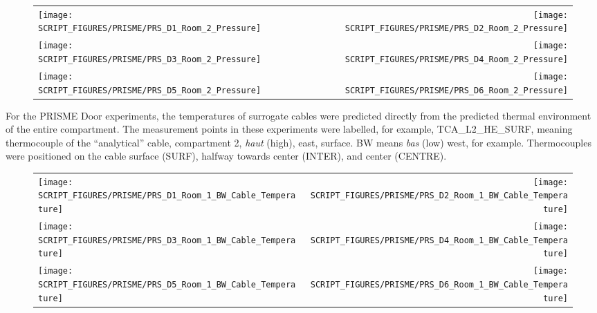 \begin{figure}[p]
\begin{tabular*}{\textwidth}{l@{\extracolsep{\fill}}r}
\texttt{[image: SCRIPT\_FIGURES/PRISME/PRS\_D1\_Room\_2\_Pressure]} &
\texttt{[image: SCRIPT\_FIGURES/PRISME/PRS\_D2\_Room\_2\_Pressure]} \\
\texttt{[image: SCRIPT\_FIGURES/PRISME/PRS\_D3\_Room\_2\_Pressure]} &
\texttt{[image: SCRIPT\_FIGURES/PRISME/PRS\_D4\_Room\_2\_Pressure]} \\
\texttt{[image: SCRIPT\_FIGURES/PRISME/PRS\_D5\_Room\_2\_Pressure]} &
\texttt{[image: SCRIPT\_FIGURES/PRISME/PRS\_D6\_Room\_2\_Pressure]}
\end{tabular*}
\label{PRISME_Room_2_Pressures}
\end{figure}

\clearpage

For the PRISME Door experiments, the temperatures of surrogate cables were predicted directly from the predicted thermal environment of the entire compartment. The measurement points in these experiments were labelled, for example, TCA\_L2\_HE\_SURF, meaning thermocouple of the ``analytical'' cable, compartment 2, {\it haut} (high), east, surface. BW means {\it bas} (low) west, for example. Thermocouples were positioned on the cable surface (SURF), halfway towards center (INTER), and center (CENTRE).

\begin{figure}[p]
\begin{tabular*}{\textwidth}{l@{\extracolsep{\fill}}r}
\texttt{[image: SCRIPT\_FIGURES/PRISME/PRS\_D1\_Room\_1\_BW\_Cable\_Temperature]} &
\texttt{[image: SCRIPT\_FIGURES/PRISME/PRS\_D2\_Room\_1\_BW\_Cable\_Temperature]} \\
\texttt{[image: SCRIPT\_FIGURES/PRISME/PRS\_D3\_Room\_1\_BW\_Cable\_Temperature]} &
\texttt{[image: SCRIPT\_FIGURES/PRISME/PRS\_D4\_Room\_1\_BW\_Cable\_Temperature]} \\
\texttt{[image: SCRIPT\_FIGURES/PRISME/PRS\_D5\_Room\_1\_BW\_Cable\_Temperature]} &
\texttt{[image: SCRIPT\_FIGURES/PRISME/PRS\_D6\_Room\_1\_BW\_Cable\_Temperature]}
\end{tabular*}
\label{PRISME_BW_Cable_Room_1}
\end{figure}

